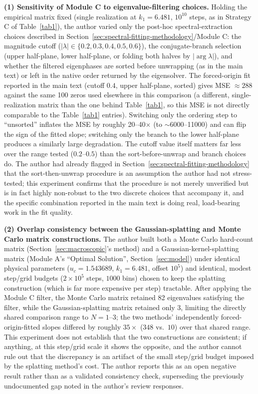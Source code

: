 \documentclass[mca,article,submit,oneauthor,pdftex]{Definitions/mdpi}
\begin{document}
\textbf{(1) Sensitivity of Module C to eigenvalue-filtering choices.}
Holding the empirical matrix fixed (single realization at $k_1=6.481$,
$10^{10}$ steps, as in Strategy C of Table~\ref{tab1}), the author varied only
the post-hoc spectral-extraction choices described in
Section~\ref{sec:spectral-fitting-methodology}/Module C: the magnitude
cutoff ($|\lambda|\in\{0.2,0.3,0.4,0.5,0.6\}$), the conjugate-branch
selection (upper half-plane, lower half-plane, or folding both halves
by $|\!\arg\lambda|$), and whether the filtered eigenphases are sorted
before unwrapping (as in the main text) or left in the native order
returned by the eigensolver. The forced-origin fit reported in the main
text (cutoff $0.4$, upper half-plane, sorted) gives MSE $\approx288$
against the same 100 zeros used elsewhere in this comparison (a
different, single-realization matrix than the one behind
Table~\ref{tab1}, so this MSE is not directly comparable to the
Table~\ref{tab1} entries). Switching only the ordering step to
``unsorted'' inflates the MSE by roughly 20--40$\times$ (to
$\sim$6000--11000) and can flip the sign of the fitted slope; switching
only the branch to the lower half-plane produces a similarly large
degradation. The cutoff value itself matters far less over the range
tested ($0.2$--$0.5$) than the sort-before-unwrap and branch choices do.
The author had already flagged in Section~\ref{sec:spectral-fitting-methodology}
that the sort-then-unwrap procedure is an assumption the author had not
stress-tested; this experiment confirms that the procedure is not merely
unverified but is in fact highly non-robust to the two discrete choices
that accompany it, and the specific combination reported in the main
text is doing real, load-bearing work in the fit quality.

\textbf{(2) Overlap consistency between the Gaussian-splatting and
Monte Carlo matrix constructions.} The author built both a Monte Carlo
hard-count matrix (Section~\ref{sec:macroscopic}'s method) and a
Gaussian-kernel-splatting matrix (Module A's ``Optimal Solution'',
Section~\ref{sec:model}) under identical physical parameters
($u_c=1.543689$, $k_1=6.481$, offset $10^5$) and identical, modest
step/grid budgets ($2\times10^5$ steps, $1000$ bins) chosen to keep the
splatting construction (which is far more expensive per step) tractable.
After applying the Module C filter, the Monte Carlo matrix retained 82
eigenvalues satisfying the filter, while the Gaussian-splatting matrix
retained only 3, limiting the directly shared comparison range to
$N=1$--$3$; the two methods' independently forced-origin-fitted slopes
differed by roughly $35\times$ ($348$ vs.\ $10$) over that shared range.
This experiment does not establish that the two constructions are
consistent; if anything, at this step/grid scale it shows the opposite,
and the author cannot rule out that the discrepancy is an artifact of the small
step/grid budget imposed by the splatting method's cost. The author reports this
as an open negative result rather than as a validated consistency check,
superseding the previously undocumented gap noted in the author's review
responses.
\end{document}
